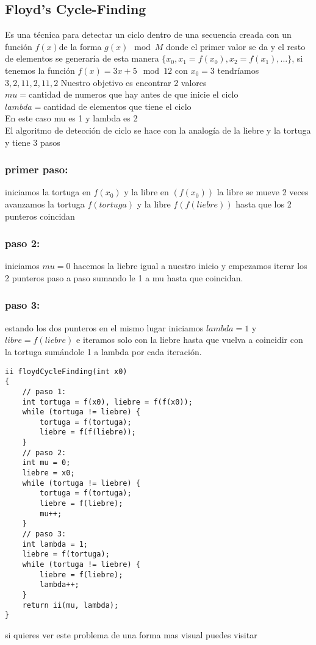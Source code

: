 \subsection{Floyd’s Cycle-Finding}
Es una técnica para detectar un ciclo dentro de una secuencia creada con un función $f(x)$de la forma $g(x) \mod{M}$
donde el primer valor se da y el resto de elementos  se generaría de esta manera $\{x_{0}, x_{1}=f(x_{0}), x_{2}=f(x_{1}),  …\}$,
si tenemos la función $f(x)=3x+5 \mod{12}$ con $x_{0}=3$ tendríamos ${3, 2,11,2,11,2}$ Nuestro objetivo es encontrar 2 valores
\\$mu = $cantidad de numeros que hay antes de que inicie el ciclo
\\$lambda = $cantidad de elementos que tiene el ciclo
\\En este caso mu es 1 y lambda es 2
\\El algoritmo de detección de ciclo se hace con la analogía de la liebre y la tortuga y tiene 3 pasos
\subsubsection{primer paso:}
iniciamos la  tortuga en $f(x_{0})$ y la libre en $(f(x_{0}))$ la libre se mueve 2 veces avanzamos la tortuga $f(tortuga)$ y la libre $f(f(liebre))$ hasta que los 2 punteros coincidan
\subsubsection{paso 2:}
iniciamos $mu=0$ hacemos la liebre igual a nuestro inicio y empezamos iterar los 2 punteros paso a paso sumando le 1 a mu hasta que coincidan.
\subsubsection{paso 3:}
estando los dos punteros en el mismo lugar iniciamos $lambda=1$ y $libre=f(liebre)$
e iteramos solo con la liebre hasta que vuelva a coincidir con la tortuga sumándole 1 a lambda por cada iteración.
\begin{minipage}{\textwidth}
\begin{lstlisting}[style=C,caption=floydCycleFinding.cpp]
ii floydCycleFinding(int x0)
{
    // paso 1:
    int tortuga = f(x0), liebre = f(f(x0));
    while (tortuga != liebre) {
        tortuga = f(tortuga);
        liebre = f(f(liebre));
    }
    // paso 2:
    int mu = 0;
    liebre = x0;
    while (tortuga != liebre) {
        tortuga = f(tortuga);
        liebre = f(liebre);
        mu++;
    }
    // paso 3:
    int lambda = 1;
    liebre = f(tortuga);
    while (tortuga != liebre) {
        liebre = f(liebre);
        lambda++;
    }
    return ii(mu, lambda);
}
\end{lstlisting}
\end{minipage}

si quieres ver este problema de una forma mas visual puedes visitar \cite{Visualgo:Online}

